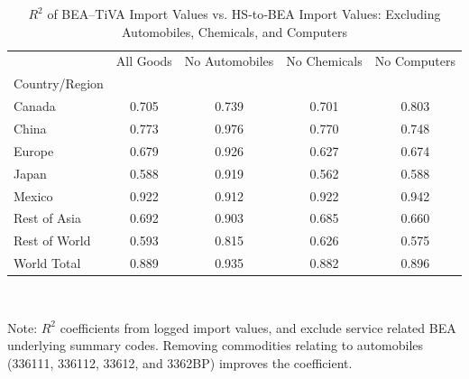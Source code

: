 \begin{table}[htbp]
\centering
\caption{$R^2$ of BEA--TiVA Import Values vs. HS‐to‐BEA Import Values: Excluding Automobiles, Chemicals, and Computers}
\label{correlation_coefficent_regions}
\begin{tabular}{lcccc}
\toprule
 & All Goods & No Automobiles & No Chemicals & No Computers \\
Country/Region &  &  &  &  \\
\midrule
Canada & 0.705 & 0.739 & 0.701 & 0.803 \\
China & 0.773 & 0.976 & 0.770 & 0.748 \\
Europe & 0.679 & 0.926 & 0.627 & 0.674 \\
Japan & 0.588 & 0.919 & 0.562 & 0.588 \\
Mexico & 0.922 & 0.912 & 0.922 & 0.942 \\
Rest of Asia & 0.692 & 0.903 & 0.685 & 0.660 \\
Rest of World & 0.593 & 0.815 & 0.626 & 0.575 \\
World Total & 0.889 & 0.935 & 0.882 & 0.896 \\
\bottomrule
\end{tabular}
\vspace{0.01cm}\\
\raggedright
{\scriptsize Note: $R^2$ coefficients from logged import values, and exclude service related BEA underlying summary codes. Removing commodities relating to automobiles (336111, 336112, 33612, and 3362BP) improves the coefficient.}

\end{table}
